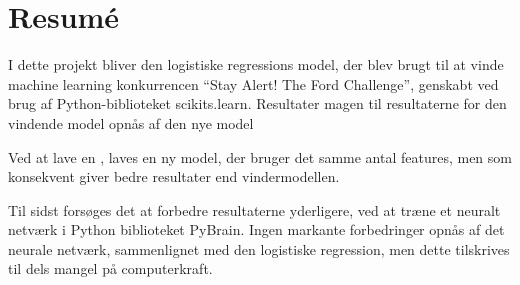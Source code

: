 \chapter*{Resum\'e} %

I dette projekt bliver den logistiske regressions model, der blev brugt til at vinde machine learning konkurrencen ``Stay Alert! The Ford Challenge'', genskabt ved brug af Python-biblioteket scikits.learn. Resultater magen til resultaterne for den vindende model opnås af den nye model \par
Ved at lave en , laves en ny model, der bruger det samme antal features, men som konsekvent giver bedre resultater end vindermodellen. \par
Til sidst forsøges det at forbedre resultaterne yderligere, ved at træne et neuralt netværk i Python biblioteket PyBrain. Ingen markante forbedringer opnås af det neurale netværk, sammenlignet med den logistiske regression, men dette tilskrives til dels mangel på computerkraft.




